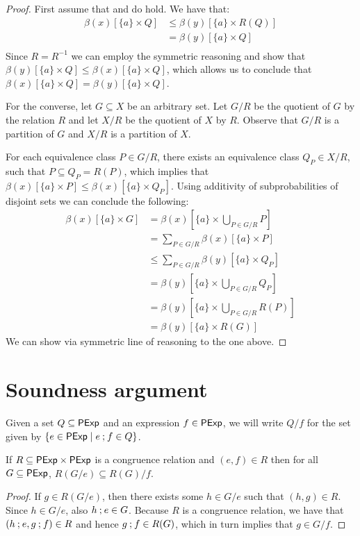 \begin{proof}
    First assume that  and  do hold.
    We have that:
    \begin{align*}
        \beta(x)[\{a\} \times Q] &\leq \beta(y)[\{a\} \times R(Q)] \\
        &= \beta(y)[\{a\} \times Q] \tag{$R$ is an equivalence relation}\\
    \end{align*}
    Since $R=R^{-1}$ we can employ the symmetric reasoning and show that $\beta(y)[\{a\} \times Q]\leq\beta(x)[\{a\} \times Q]$, which allows us to conclude that $\beta(x)[\{a\} \times Q]=\beta(y)[\{a\} \times Q]$.

    For the converse, let $G \subseteq X$ be an arbitrary set. 
    Let \(G / {R}\) be the quotient of \(G\) by the relation \(R\) and let \(X / {R}\) be the quotient of \(X\) by \(R\).
    Observe that \(G / {R}\) is a partition of \(G\) and \(X / {R}\) is a partition of \(X\).

    For each equivalence class \(P \in G / {R}\), there exists an equivalence class \(Q_P \in X / {R}\), such that \(P \subseteq Q_P = R(P)\), which implies that \(\beta(x)[\{a\} \times P] \leq \beta(x)[\{a\} \times Q_P]\).
    Using additivity of subprobabilities of disjoint sets we can conclude the following:
	\begin{align*}
		\beta(x)[\{a\} \times G] &= \beta(x)\left[\{a\} \times \bigcup_{P \in G / {R}} P \right] \\
        &= \sum_{P \in G / {R}} \beta(x)[\{a\} \times P]\\
        &\leq \sum_{P \in G / {R}} \beta(y)[\{a\} \times Q_P]\\
        &= \beta(y)\left[\{a\} \times \bigcup_{P \in G / {R}} Q_P\right]\\
        &= \beta(y)\left[\{a\} \times \bigcup_{P \in G / {R}} R(P)\right]\\
        &= \beta(y)[\{a\} \times R(G)]
	\end{align*}
    We can show  via symmetric line of reasoning to the one above.
\end{proof}
\section{Soundness argument}
Given a set $Q \subseteq \mathsf{PExp}$ and an expression $f \in \mathsf{PExp}$, we will write $
{Q}/{f}$ for the set given by $\{e \in \mathsf{PExp} \mid e \mathbin{;} f \in Q\}
$.
\begin{lemma}\label{apx:lem:cutting_postfixes}
    If \(R \subseteq \mathsf{PExp} \times \mathsf{PExp}\) is a congruence relation and \(({e}, {f}) \in R\) then for all $G \subseteq \mathsf{PExp}$, \(R(G / {{e}}) \subseteq R(G) / {f} \).
\end{lemma}
\begin{proof}
    If \({g} \in  R(G / {e})\), then there exists some \({h} \in G / {e}\) such that \(({h}, {g})\in R\).
    Since \({h} \in G / {e}\), also \({h} \mathbin{;} {e} \in G\).
    Because \(R\) is a congruence relation, we have that \(({h}\mathbin{;} {e}, {g}\mathbin{;} {f})\in R\) and hence \({g}\mathbin{;} {f} \in R(G)\), which in turn implies that \({g} \in G / {f}\).
\end{proof}

